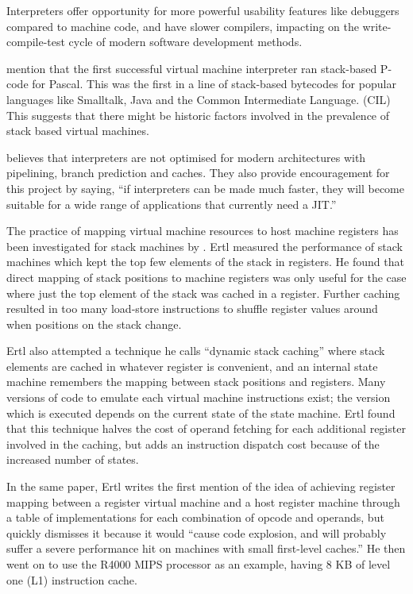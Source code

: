 		Interpreters offer opportunity for more powerful usability features like debuggers compared to machine code, and have slower compilers, impacting on the write-compile-test cycle of modern software development methods.
		
		\cite{caseregistervm} mention that the first successful virtual machine interpreter ran stack-based P-code for Pascal. This was the first in a line of stack-based bytecodes for popular languages like Smalltalk, Java and the Common Intermediate Language. (CIL) This suggests that there might be historic factors involved in the prevalence of stack based virtual machines.
		
		\cite{fastjava} believes that interpreters are not optimised for modern architectures with pipelining, branch prediction and caches. They also provide encouragement for this project by saying, ``if interpreters can be made much faster, they will become suitable for a wide range of applications that currently need a JIT.''
		
		
		The practice of mapping virtual machine resources to host machine registers has been investigated for stack machines by \cite{stackcaching}. Ertl measured the performance of stack machines which kept the top few elements of the stack in registers. He found that direct mapping of stack positions to machine registers was only useful for the case where just the top element of the stack was cached in a register. Further caching resulted in too many load-store instructions to shuffle register values around when positions on the stack change.
		
		Ertl also attempted a technique he calls ``dynamic stack caching'' where stack elements are cached in whatever register is convenient, and an internal state machine remembers the mapping between stack positions and registers. Many versions of code to emulate each virtual machine instructions exist; the version which is executed depends on the current state of the state machine. Ertl found that this technique halves the cost of operand fetching for each additional register involved in the caching, but adds an instruction dispatch cost because of the increased number of states.
		
		In the same paper, Ertl writes the first mention of the idea of achieving register mapping between a register virtual machine and a host register machine through a table of implementations for each combination of opcode and operands, but quickly dismisses it because it would ``cause code explosion, and will probably suffer a severe performance hit on machines with small first-level caches.'' He then went on to use the R4000 MIPS processor as an example, having 8 KB of level one (L1) instruction cache.
	

